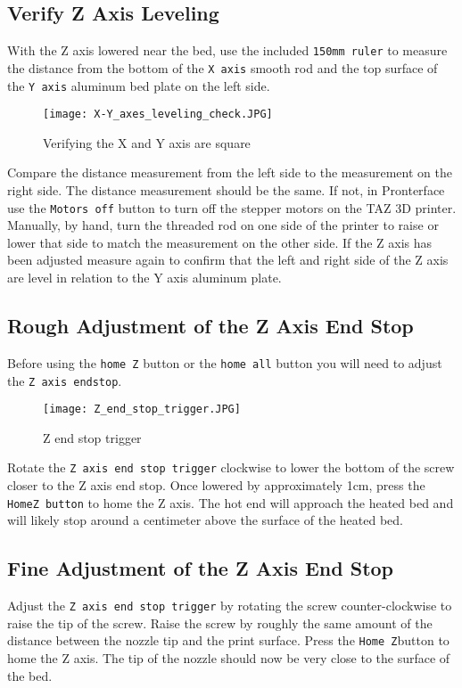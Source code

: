 \subsection{Verify Z Axis Leveling}
With the Z axis lowered near the bed, use the included \texttt{150mm ruler} to measure the distance from the bottom of the \texttt{X axis} smooth rod and the top surface of the \texttt{Y axis} aluminum bed plate on the left side.
\begin{figure}[H]
\centering
\texttt{[image: X-Y\_axes\_leveling\_check.JPG]}
\caption{Verifying the X and Y axis are square}
\label{fig:X-Y_axes_leveling_check}
\end{figure} 
Compare the distance measurement from the left side to the measurement on the right side. The distance measurement should be the same. If not, in Pronterface use the \texttt{Motors off} button to turn off the stepper motors on the TAZ 3D printer. Manually, by hand, turn the threaded rod on one side of the printer to raise or lower that side to match the measurement on the other side. If the Z axis has been adjusted measure again to confirm that the left and right side of the Z axis are level in relation to the Y axis aluminum plate.

\subsection{Rough Adjustment of the Z Axis End Stop}
Before using the \texttt{home Z} button or the \texttt{home all} button you will need to adjust the \texttt{Z axis endstop}.
\begin{figure}[p]
\centering
\texttt{[image: Z\_end\_stop\_trigger.JPG]}
\caption{Z end stop trigger}
\label{fig:Z_end_stop_trigger}
\end{figure}
Rotate the \texttt{Z axis end stop trigger} clockwise to lower the bottom of the screw closer to the Z axis end stop. Once lowered by approximately 1cm, press the \texttt{HomeZ button} to home the Z axis. The hot end will approach the heated bed and will likely stop around a centimeter above the surface of the heated bed.

\subsection{Fine Adjustment of the Z Axis End Stop}
Adjust the \texttt{Z axis end stop trigger} by rotating the screw counter-clockwise to raise the tip of the screw. Raise the screw by roughly the same amount of the distance between the nozzle tip and the print surface. Press the \texttt{Home Z}button to home the Z axis. The tip of the nozzle should now be very close to the surface of the bed.

